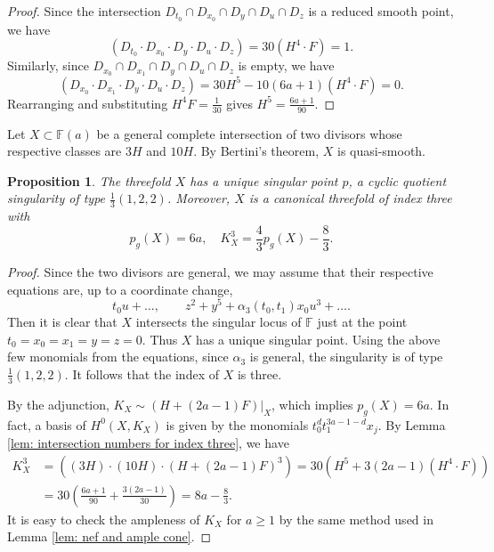 \documentclass[a4paper,11pt]{amsart}
\newcommand{\FF}{\ensuremath{\mathbb{F}}}
\newtheorem{prop}[thm]{Proposition}
\theoremstyle{definition}
\theoremstyle{remark}
\numberwithin{equation}{section}
\begin{document}
\begin{proof}
    Since the intersection $D_{t_0} \cap D_{x_0} \cap D_y \cap D_u \cap D_z$ is a reduced smooth point, we have 
    $$
    (D_{t_0} \cdot D_{x_0} \cdot D_y \cdot D_u \cdot D_z)= 30 (H^4 \cdot F) = 1.
    $$
    Similarly, since $D_{x_0} \cap D_{x_1} \cap  D_y \cap D_u \cap D_z$ is empty, we have
    $$
    (D_{x_0} \cdot D_{x_1} \cdot D_y \cdot D_u \cdot D_z) =30 H^5 - 10 (6a+1) (H^4 \cdot F) =0.
    $$
    Rearranging and substituting $H^4F=\frac1{30}$ gives $H^5=\frac{6a+1}{90}$.
\end{proof}

Let $X \subset \FF(a)$ be a general complete intersection of two divisors whose respective classes are $3H$ and $10H$. By Bertini's theorem, $X$ is quasi-smooth. 

\begin{prop} \label{prop: index three}
    The threefold $X$ has a unique singular point $p$, a cyclic quotient singularity of type $\frac13(1,2,2)$. Moreover, $X$ is a canonical threefold of index three with
    $$
    p_g(X)=6a, \quad K^3_X=\frac43 p_g(X)-\frac83.
    $$
\end{prop}

\begin{proof}
    Since the two divisors are general, we may assume that their respective equations are, up to a coordinate change,
    $$
    t_0u +\ldots, \qquad z^2+y^5+\alpha_3(t_0,t_1)x_0u^3 + \ldots.
    $$
    Then it is clear that $X$ intersects the singular locus of $\FF$ just at the point $t_0=x_0=x_1=y=z=0$. Thus $X$ has a unique singular point. Using the above few monomials from the equations, since $\alpha_3$ is general, the singularity is of type $\frac13(1,2,2)$. It follows that the index of $X$ is three.

    By the adjunction, $K_X \sim (H + (2a-1)F)|_X$, which implies $p_g(X) = 6a$. In fact, a basis of $H^0(X, K_X)$ is given by the monomials $t_0^dt_1^{3a-1-d}x_j$. By Lemma \ref{lem: intersection numbers for index three}, we have
    \begin{align*}
        K_X^3 & =\left((3H) \cdot (10H) \cdot \left( H + (2a-1)F \right)^3 \right) =30 \left( H^5 + 3(2a-1)(H^4 \cdot F) \right) \\
        & =30 \left(\frac{6a+1}{90} + \frac{3(2a-1)}{30}\right) = 8a-\frac83.
    \end{align*}
    It is easy to check the ampleness of $K_X$ for $a\ge 1$ by the same method used in Lemma \ref{lem: nef and ample cone}.
\end{proof}
\end{document}
